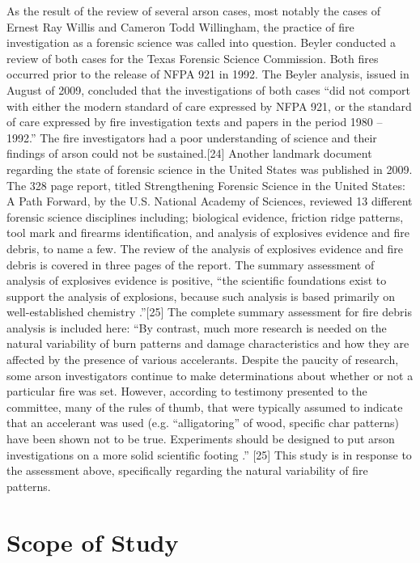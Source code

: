 \documentclass[twoside]{uocthesis}
\begin{document}
As the result of the review of several arson cases, most notably the cases of Ernest Ray Willis and Cameron Todd Willingham, the practice of fire investigation as a forensic science was called into question.  Beyler conducted a review of both cases for the Texas Forensic Science Commission.  Both fires occurred prior to the release of NFPA 921 in 1992.  The Beyler analysis, issued in August of 2009, concluded that the investigations of both cases “did not comport with either the modern standard of care expressed by NFPA 921, or the standard of care expressed by fire investigation texts and papers in the period 1980 – 1992.”  The fire investigators had a poor understanding of science and their findings of arson could not be sustained.[24]
Another landmark document regarding the state of forensic science in the United States was published in 2009.  The 328 page report, titled Strengthening Forensic Science in the United States: A Path Forward, by the U.S. National Academy of Sciences, reviewed 13 different forensic science disciplines including; biological evidence, friction ridge patterns, tool mark and firearms identification, and analysis of explosives evidence and fire debris, to name a few.  The review of the analysis of explosives evidence and fire debris is covered in three pages of the report.  The summary assessment of analysis of explosives evidence is positive, “the scientific foundations exist to support the analysis of explosions, because such analysis is based primarily on well-established chemistry .”[25]  The complete summary assessment for fire debris analysis is included here: “By contrast, much more research is needed on the natural variability of burn patterns and damage characteristics and how they are affected by the presence of various accelerants.  Despite the paucity of research, some arson investigators continue to make determinations about whether or not a particular fire was set.  However, according to testimony presented to the committee, many of the rules of thumb, that were typically assumed to indicate that an accelerant was used (e.g. “alligatoring” of wood, specific char patterns) have been shown not to be true.  Experiments should be designed to put arson investigations on a more solid scientific footing .” [25]   
This study is in response to the assessment above, specifically regarding the natural variability of fire patterns. 

\chapter{Scope of Study}
\end{document}
